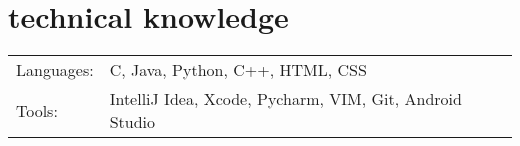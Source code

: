 \documentclass[a4paper, 10pt, oneside]{article}
\begin{document}

\vspace{-1em}
\section{\color{headings}technical knowledge}
\vspace{-0.5em}
\color{text1}
\raggedright
\begin{tabular}{l l}
Languages: & C, Java, Python, C++, HTML, CSS\\
Tools: & IntelliJ Idea, Xcode, Pycharm, VIM, Git, Android Studio\\
\end{tabular}
\end{document}
